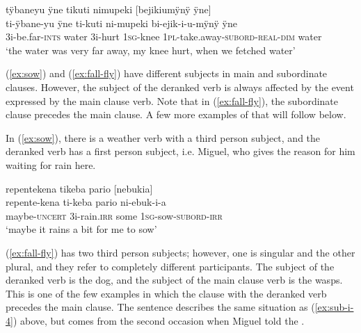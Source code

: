 \ea\label{ex:temcause}
\begingl
\glpreamble tÿbaneyu ÿne tikuti nimupeki \textup{[}bejikiumÿnÿ ÿne\textup{]}\\
\gla ti-ÿbane-yu ÿne ti-kuti ni-mupeki bi-ejik-i-u-mÿnÿ ÿne\\
\glb 3i-be.far-\textsc{ints} water 3i-hurt 1\textsc{sg}-knee 1\textsc{pl}-take.away-\textsc{subord}-\textsc{real}-\textsc{dim} water\\
\glft ‘the water was very far away, my knee hurt, when we fetched water’
\endgl
\trailingcitation{[jxx-p120515l-2.005]}
\xe

(\ref{ex:sow}) and (\ref{ex:fall-fly}) have different subjects in main and subordinate clauses. However, the subject of the deranked verb is always affected by the event expressed by the main clause verb. Note that in (\ref{ex:fall-fly}), the subordinate clause precedes the main clause. A few more examples of that will follow below.


In (\ref{ex:sow}), there is a weather verb with a third person subject, and the deranked verb has a first person subject, i.e. Miguel, who gives the reason for him waiting for rain here.

\ea\label{ex:sow}
\begingl
\glpreamble repentekena tikeba pario \textup{[}nebukia\textup{]}\\
\gla repente-kena ti-keba pario ni-ebuk-i-a\\
\glb maybe-\textsc{uncert} 3i-rain.\textsc{irr} some 1\textsc{sg}-sow-\textsc{subord}-\textsc{irr} \\
\glft ‘maybe it rains a bit for me to sow’
\endgl
\trailingcitation{[mqx-p110826l.616]}
\xe

(\ref{ex:fall-fly}) has two third person subjects; however, one is singular and the other plural, and they refer to completely different participants. The subject of the deranked verb is the dog, and the subject of the main clause verb is the wasps. This is one of the few examples in which the clause with the deranked verb precedes the main clause. The sentence describes the same situation as (\ref{ex:sub-i-4}) above, but comes from the second occasion when Miguel told the .

